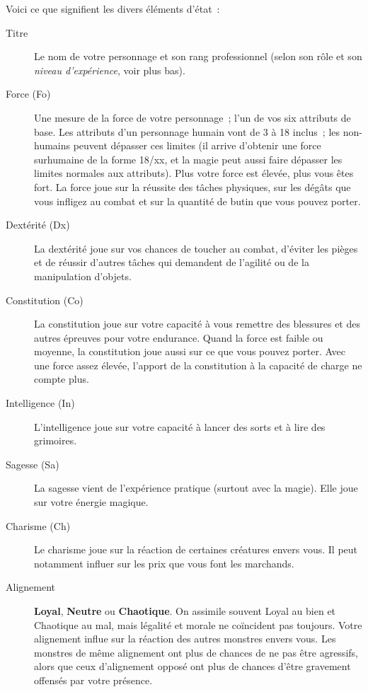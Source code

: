 \documentclass[titlepage]{article}
\begin{document}
Voici ce que signifient les divers éléments d'état~:

\begin{description}
\item[{Titre}]
Le nom de votre personnage et son rang professionnel (selon son rôle et
son \textit{niveau d'expérience}, voir plus bas).

\item[{Force (Fo)}]
Une mesure de la force de votre personnage~; l'un de vos six attributs de
base.
Les attributs d'un personnage humain vont de 3 à 18 inclus~; les
non-humains peuvent dépasser ces limites
(il arrive d'obtenir une force surhumaine de la forme 18/xx, et la magie
peut aussi faire dépasser les limites normales aux attributs).
Plus votre force est élevée, plus vous êtes fort.
La force joue sur la réussite des tâches physiques, sur les dégâts que vous
infligez au combat et sur la quantité de butin que vous pouvez porter.

\item[{Dextérité (Dx)}]
La dextérité joue sur vos chances de toucher au combat, d'éviter les pièges
et de réussir d'autres tâches qui demandent de l'agilité ou de la
manipulation d'objets.

\item[{Constitution (Co)}]
La constitution joue sur votre capacité à vous remettre des blessures et
des autres épreuves pour votre endurance.
Quand la force est faible ou moyenne, la constitution joue aussi sur ce
que vous pouvez porter.
Avec une force assez élevée, l'apport de la constitution à la capacité de
charge ne compte plus.

\item[{Intelligence (In)}]
L'intelligence joue sur votre capacité à lancer des sorts et à lire des
grimoires.

\item[{Sagesse (Sa)}]
La sagesse vient de l'expérience pratique (surtout avec la magie).
Elle joue sur votre énergie magique.

\item[{Charisme (Ch)}]
Le charisme joue sur la réaction de certaines créatures envers vous.
Il peut notamment influer sur les prix que vous font les marchands.

\item[{Alignement}]
\textbf{Loyal}, \textbf{Neutre} ou \textbf{Chaotique}.
On assimile souvent Loyal au bien et Chaotique au mal, mais légalité et
morale ne coïncident pas toujours.
Votre alignement influe sur la réaction des autres monstres envers vous.
Les monstres de même alignement ont plus de chances de ne pas être
agressifs, alors que ceux d'alignement opposé ont plus de chances d'être
gravement offensés par votre présence.


\end{description}
\end{document}

